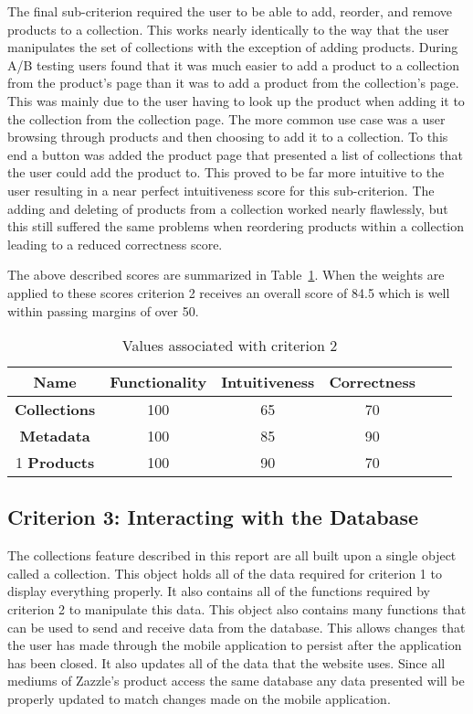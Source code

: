 \documentclass[12pt]{article}
\begin{document}
The final sub-criterion required the user to be able to add, reorder, and remove products to a collection. This works nearly identically to the way that the user manipulates the set of collections with the exception of adding products. During A/B testing users found that it was much easier to add a product to a collection from the product's page than it was to add a product from the collection's page. This was mainly due to the user having to look up the product when adding it to the collection from the collection page. The more common use case was a user browsing through products and then choosing to add it to a collection. To this end a button was added the product page that presented a list of collections that the user could add the product to. This proved to be far more intuitive to the user resulting in a near perfect intuitiveness score for this sub-criterion. The adding and deleting of products from a collection worked nearly flawlessly, but this still suffered the same problems when reordering products within a collection leading to a reduced correctness score.

The above described scores are summarized in Table~\ref{table:5}. When the weights are applied to these scores criterion 2 receives an overall score of 84.5 which is well within passing margins of over 50.

\begin{table}[h!]
\centering
	\begin{tabular}{|c|c|c|c|c|c|} 
		\hline
		\textbf{Name} & \textbf{Functionality} & \textbf{Intuitiveness} & \textbf{Correctness}\\
		\hline
		\textbf{Collections} 			& 100 & 65 & 70\\
		\hline
		\textbf{Metadata} 				& 100 & 85 & 90\\
		\hline1
		\textbf{Products} 				& 100 & 90 & 70\\
		\hline
	\end{tabular}
\caption{Values associated with criterion 2}
\label{table:5}
\end{table}


\subsection{Criterion 3: Interacting with the Database} %
\label{sub:criterion_3_interacting_with_the_database}
The collections feature described in this report are all built upon a single object called a collection. This object holds all of the data required for criterion 1 to display everything properly. It also contains all of the functions required by criterion 2 to manipulate this data. This object also contains many functions that can be used to send and receive data from the database. This allows changes that the user has made through the mobile application to persist after the application has been closed. It also updates all of the data that the website uses. Since all mediums of Zazzle's product access the same database any data presented will be properly updated to match changes made on the mobile application.  
\end{document}

